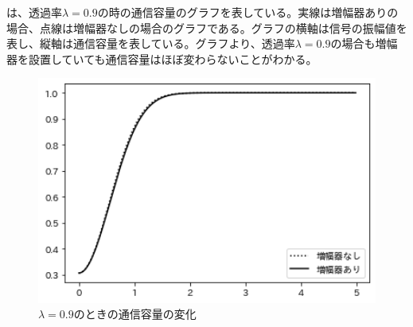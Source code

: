 \newpage
{}は、透過率$\lambda=0.9$の時の通信容量のグラフを表している。実線は増幅器ありの場合、点線は増幅器なしの場合のグラフである。グラフの横軸は信号の振幅値を表し、縦軸は通信容量を表している。グラフより、透過率$\lambda=0.9$の場合も増幅器を設置していても通信容量はほぼ変わらないことがわかる。

    \begin{figure}[H]
        \centering   
        \includegraphics[width=1\textwidth]{img/Fig5_6.png}
        \caption[sample image (png)]{$\lambda=0.9$のときの通信容量の変化}
        \label{Fig5_6}
    \end{figure}






    
